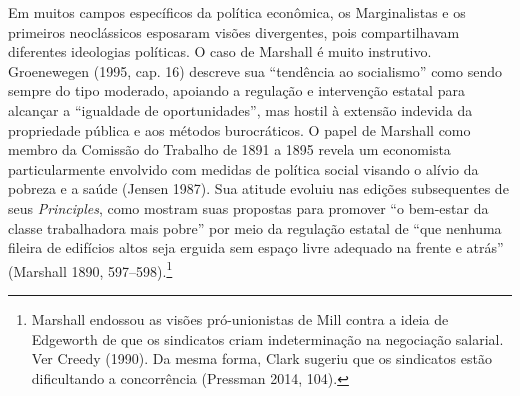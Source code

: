 \documentclass[12pt]{article}
\begin{document}
Em muitos campos específicos da política econômica, os Marginalistas e os primeiros neoclássicos esposaram visões divergentes, pois compartilhavam diferentes ideologias políticas. O caso de Marshall é muito instrutivo. Groenewegen (1995, cap. 16) descreve sua “tendência ao socialismo” como sendo sempre do tipo moderado, apoiando a regulação e intervenção estatal para alcançar a “igualdade de oportunidades”, mas hostil à extensão indevida da propriedade pública e aos métodos burocráticos. O papel de Marshall como membro da Comissão do Trabalho de 1891 a 1895 revela um economista particularmente envolvido com medidas de política social visando o alívio da pobreza e a saúde (Jensen 1987). Sua atitude evoluiu nas edições subsequentes de seus \textit{Principles}, como mostram suas propostas para promover “o bem-estar da classe trabalhadora mais pobre” por meio da regulação estatal de “que nenhuma fileira de edifícios altos seja erguida sem espaço livre adequado na frente e atrás” (Marshall 1890, 597–598).\footnote{Marshall endossou as visões pró-unionistas de Mill contra a ideia de Edgeworth de que os sindicatos criam indeterminação na negociação salarial. Ver Creedy (1990). Da mesma forma, Clark sugeriu que os sindicatos estão dificultando a concorrência (Pressman 2014, 104).}
\end{document}
